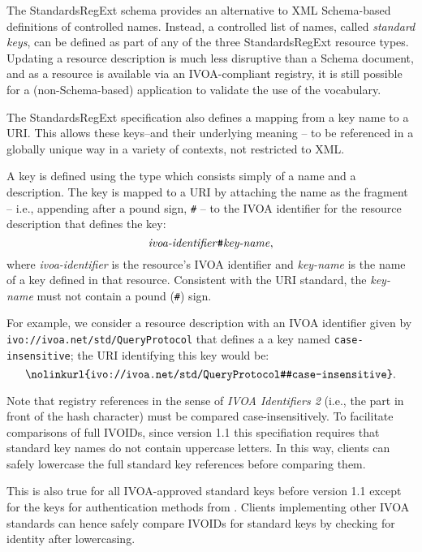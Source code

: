 \documentclass[11pt,a4paper]{ivoa}
\begin{document}
The StandardsRegExt schema provides an alternative to XML Schema-based
definitions of controlled names.  Instead, a controlled list of names,
called \emph{standard keys}, can be defined as part of any of the three
StandardsRegExt resource types.  Updating a resource description is much
less disruptive than a Schema document, and as a resource is available
via an IVOA-compliant registry, it is still possible for a
(non-Schema-based) application to validate the use of the vocabulary.




The StandardsRegExt specification also defines a mapping from a key name to
a URI.  This allows these keys--and their underlying meaning -- to be
referenced in a globally unique way in a variety of contexts, not
restricted to XML.



A key is defined using the  type which
consists simply of a name and a description.  The key is mapped to a
URI by attaching the name as the fragment -- i.e., appending after a
pound sign, \verb|#| -- to the IVOA identifier for the resource
description that defines the key:
$$
\hbox{\emph{ivoa-identifier}\verb|#|\emph{key-name}},
$$
where \emph{ivoa-identifier} is the resource's IVOA identifier and
\emph{key-name} is the name of a key defined in that resource.
Consistent with the URI standard, the
\emph{key-name} must not contain a pound (\verb|#|) sign.



For example, we consider a resource description with an IVOA
identifier given by
\nolinkurl{ivo://ivoa.net/std/QueryProtocol} that
defines a a key named \texttt{case-insensitive}; the URI
identifying this key would be:
$$
\hbox{\nolinkurl{ivo://ivoa.net/std/QueryProtocol#case-insensitive}}.
$$

Note that registry references in the sense of \emph{IVOA Identifiers 2}
(i.e., the part in front of the hash character) must be compared
case-insensitively.  To facilitate comparisons of full IVOIDs, since
version 1.1 this specifiation requires that standard key names do not
contain uppercase letters.  In this way, clients can safely lowercase
the full standard key references before comparing them.

This is also true for all IVOA-approved standard keys before version 1.1
except for the keys for authentication methods from
\citet{2017ivoa.spec.0524T}.  Clients implementing other IVOA standards
can hence safely compare IVOIDs for standard keys by checking for
identity after lowercasing.
\end{document}
